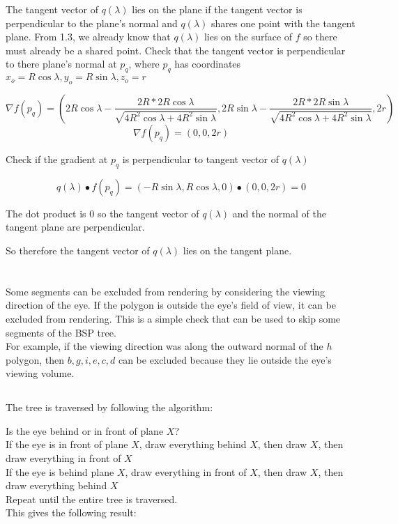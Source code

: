 \documentclass[a4paper,10pt]{scrartcl}
\begin{document}
The tangent vector of $q(\lambda)$ lies on the plane if the tangent vector is perpendicular to the plane's
normal and $q(\lambda)$ shares one point with the tangent plane. From 1.3, we already know that $q(\lambda)$ lies on
the surface of $f$ so there must already be a shared point. Check that the tangent vector is perpendicular to there
plane's normal at $p_q$, where $p_q$ has coordinates $x_o = R\cos\lambda, y_o = R\sin\lambda, z_o = r$

\[\nabla f(p_q) = (2R\cos\lambda - \frac{2R * 2R\cos\lambda}{\sqrt{4R^2\cos\lambda + 4R^2\sin\lambda}}, 2R\sin\lambda - \frac{2R * 2R\sin\lambda}{\sqrt{4R^2\cos\lambda + 4R^2\sin\lambda}}, 2r)\]
\[\nabla f(p_q) = (0, 0, 2r)\]

Check if the gradient at $p_q$ is perpendicular to tangent vector of $q(\lambda)$

\[q(\lambda) \bullet f(p_q) = (-R\sin\lambda, R\cos\lambda, 0) \bullet (0, 0, 2r) = 0\]

The dot product is $0$ so the tangent vector of $q(\lambda)$ and the normal of the tangent plane are perpendicular.

So therefore the tangent vector of $q(\lambda)$ lies on the tangent plane.


\section{}

\subsection{}
Some segments can be excluded from rendering by considering the viewing direction of the eye. If the
polygon is outside the eye's field of view, it can be excluded from rendering. This is a simple check that 
can be used to skip some segments of the BSP tree. \\

For example, if the viewing direction was along the outward normal of the $h$ polygon, then $b, g, i, e, c, d$ can be excluded
because they lie outside the eye's viewing volume.


\subsection{}

\subsection{}

The tree is traversed by following the algorithm:

Is the eye behind or in front of plane $X$? \\
If the eye is in front of plane $X$, draw everything behind $X$, then draw $X$, then draw everything in front of $X$\\
If the eye is behind plane $X$, draw everything in front of $X$, then draw $X$, then draw everything behind $X$ \\

Repeat until the entire tree is traversed. \\

This gives the following result:
\end{document}
